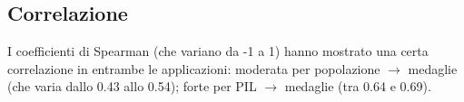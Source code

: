 \subsection{Correlazione}\label{sec:results_correlation}




%
%
%



I coefficienti di Spearman (che variano da -1 a 1) hanno mostrato una certa
correlazione in entrambe le applicazioni: moderata per popolazione $\to$ medaglie
(che varia dallo 0.43 allo 0.54); forte per PIL $\to$ medaglie (tra 0.64 e 0.69).

